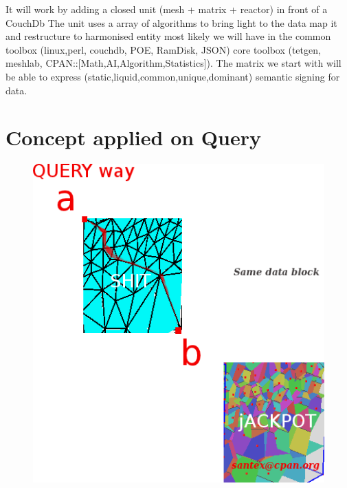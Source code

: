 \documentclass[11pt]{article}
\begin{document}
\begin{itemize}
It will work by adding a closed unit (mesh + matrix + reactor) in front of a CouchDb
The unit uses a array of algorithms to bring light to the data map it and restructure to harmonised entity most likely we will have in the
common toolbox (linux,perl, couchdb, POE, RamDisk, JSON)
core toolbox (tetgen, meshlab, CPAN::[Math,AI,Algorithm,Statistics]).
The matrix we start with will be able to express
(static,liquid,common,unique,dominant) semantic signing for data.


\section{Concept applied on Query}
\begin{figure}[htp]
\includegraphics[scale=0.43]{image/research-base-003.png}


\end{figure}
\end{itemize}
\end{document}
